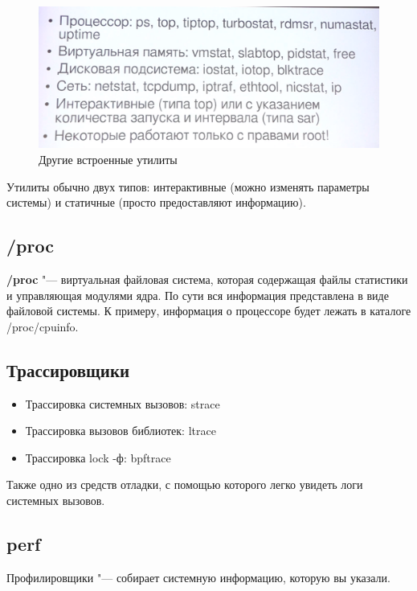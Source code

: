 \documentclass[bachelor, och, book]{SCWorks}
\theoremstyle{remark}
\begin{document}
    \begin{figure}[H]
        \begin{center}
            \includegraphics[scale=0.45]{res/standart-debug-ytil-linux.png}
            \caption{Другие встроенные утилиты}
        \end{center}
    \end{figure}


    Утилиты обычно двух типов: интерактивные (можно изменять параметры системы) и статичные (просто предоставляют информацию).

    \subsection{/proc}

    \textbf{/proc} "--- виртуальная файловая система, которая содержащая файлы статистики и управляющая модулями ядра. По сути вся информация представлена в виде файловой системы. К примеру, информация о процессоре будет лежать в каталоге /proc/cpuinfo.

    \subsection{Трассировщики}

    \begin{itemize}[label=$\bullet$]
        \item Трассировка системных вызовов: strace
        \item Трассировка вызовов библиотек: ltrace
        \item Трассировка lock -ф: bpftrace
    \end{itemize}

    Также одно из средств отладки, с помощью которого легко увидеть логи системных вызовов.

    \subsection{perf}
    Профилировщики "--- собирает системную информацию, которую вы указали.
\end{document}

